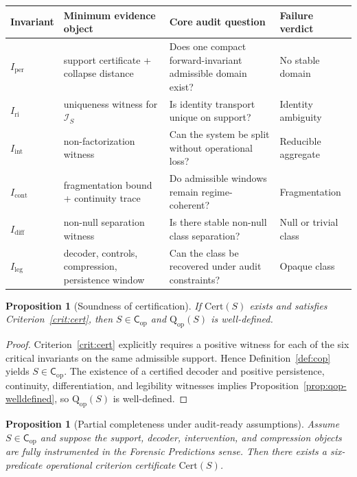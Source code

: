 \documentclass[11pt,a4paper]{article}
\newtheorem{proposition}[theorem]{Proposition}
\theoremstyle{definition}
\newcommand{\Cop}{\mathsf{C}_{\mathrm{op}}}
\newcommand{\Qop}{\mathrm{Q}_{\mathrm{op}}}
\newcommand{\Iper}{I_{\mathrm{per}}}
\newcommand{\Iri}{I_{\mathrm{ri}}}
\newcommand{\Iint}{I_{\mathrm{int}}}
\newcommand{\Icont}{I_{\mathrm{cont}}}
\newcommand{\Idiff}{I_{\mathrm{diff}}}
\newcommand{\Ileg}{I_{\mathrm{leg}}}
\newcommand{\Id}{\mathcal{I}}
\begin{document}
\begin{center}
\small
\renewcommand{\arraystretch}{1.14}
\setlength{\tabcolsep}{4.5pt}
\begin{tabularx}{\textwidth}{>{\raggedright\arraybackslash}p{1.45cm} Y >{\raggedright\arraybackslash}p{3.15cm} >{\raggedright\arraybackslash}p{2.4cm}}
\toprule
Invariant & Minimum evidence object & Core audit question & Failure verdict \\
\midrule
$\Iper$ & support certificate + collapse distance & Does one compact forward-invariant admissible domain exist? & No stable domain \\
$\Iri$ & uniqueness witness for $\Id_S$ & Is identity transport unique on support? & Identity ambiguity \\
$\Iint$ & non-factorization witness & Can the system be split without operational loss? & Reducible aggregate \\
$\Icont$ & fragmentation bound + continuity trace & Do admissible windows remain regime-coherent? & Fragmentation \\
$\Idiff$ & non-null separation witness & Is there stable non-null class separation? & Null or trivial class \\
$\Ileg$ & decoder, controls, compression, persistence window & Can the class be recovered under audit constraints? & Opaque class \\
\bottomrule
\end{tabularx}
\end{center}

\begin{proposition}[Soundness of certification]\label{prop:cert-sound}
If $\mathrm{Cert}(S)$ exists and satisfies Criterion~\ref{crit:cert}, then $S \in \Cop$ and $\Qop(S)$ is well-defined.
\end{proposition}

\begin{proof}
Criterion~\ref{crit:cert} explicitly requires a positive witness for each of the six critical invariants on the same admissible support. Hence Definition~\ref{def:cop} yields $S \in \Cop$. The existence of a certified decoder and positive persistence, continuity, differentiation, and legibility witnesses implies Proposition~\ref{prop:qop-welldefined}, so $\Qop(S)$ is well-defined.
\end{proof}

\begin{proposition}[Partial completeness under audit-ready assumptions]\label{prop:cert-complete}
Assume $S \in \Cop$ and suppose the support, decoder, intervention, and compression objects are fully instrumented in the \textit{Forensic Predictions} sense. Then there exists a six-predicate operational criterion certificate $\mathrm{Cert}(S)$.
\end{proposition}
\end{document}
